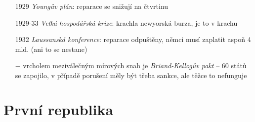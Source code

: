 \documentclass{article}
\begin{document}
\begin{itemize}
  \item[1929] \textit{Youngův plán}: reparace se snižují na čtvrtinu
  \item[1929-33] \textit{Velká hospodářská krize}: krachla newyorská burza, je to v krachu
  \item[1932] \textit{Laussanská konference}: reparace odpuštěny, němci musí zaplatit aspoň 4 mld. (ani to se nestane)
  \item[$-$] vrcholem meziválečným mírových snah je \textit{Briand-Kellogův pakt}  -- 60 států se zapojilo, v případě porušení měly být třeba sankce, ale těžce to nefunguje
\end{itemize}


\section*{První republika}
\end{document}
